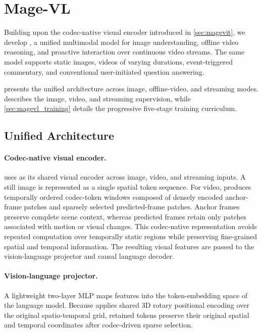 \section{Mage-VL}
\label{sec:magevl}

Building upon the codec-native visual encoder introduced in \cref{sec:magevit}, we develop \magevl, a unified multimodal model for image understanding, offline video reasoning, and proactive interaction over continuous video streams. The same model supports static images, videos of varying durations, event-triggered commentary, and conventional user-initiated question answering.

 presents the unified architecture across image, offline-video, and streaming modes.  describes the image, video, and streaming supervision, while \cref{sec:magevl_training} details the progressive five-stage training curriculum.


\subsection{Unified Architecture}
\label{sec:magevl_arch}

\paragraph{Codec-native visual encoder.}
\magevl uses \magevit as its shared visual encoder across image, video, and streaming inputs. A still image is represented as a single spatial token sequence. For video, \magevit produces temporally ordered codec-token windows composed of densely encoded anchor-frame patches and sparsely selected predicted-frame patches. Anchor frames preserve complete scene context, whereas predicted frames retain only patches associated with motion or visual changes. This codec-native representation avoids repeated computation over temporally static regions while preserving fine-grained spatial and temporal information. The resulting visual features are passed to the vision-language projector and causal language decoder.

\paragraph{Vision-language projector.}
A lightweight two-layer MLP maps \magevit features into the token-embedding space of the language model. Because \magevit applies shared 3D rotary positional encoding over the original spatio-temporal grid, retained tokens preserve their original spatial and temporal coordinates after codec-driven sparse selection.

